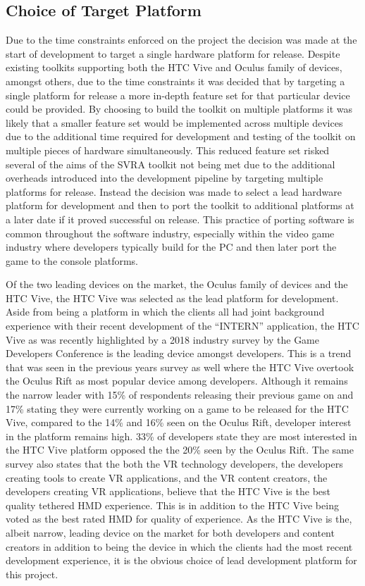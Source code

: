 \documentclass{l4proj}
\begin{document}
\subsection{Choice of Target Platform}
\label{sec:decisionhardware}
Due to the time constraints enforced on the project the decision was made at the start of development to target a single hardware platform for release. Despite existing toolkits supporting both the HTC Vive and Oculus family of devices, amongst others, due to the time constraints it was decided that by targeting a single platform for release a more in-depth feature set for that particular device could be provided. By choosing to build the toolkit on multiple platforms it was likely that a smaller feature set would be implemented across multiple devices due to the additional time required for development and testing of the toolkit on multiple pieces of hardware simultaneously. This reduced feature set risked several of the aims of the SVRA toolkit not being met due to the additional overheads introduced into the development pipeline by targeting multiple platforms for release. Instead the decision was made to select a lead hardware platform for development and then to port the toolkit to additional platforms at a later date if it proved successful on release. This practice of porting software is common throughout the software industry, especially within the video game industry where developers typically build for the PC and then later port the game to the console platforms.

Of the two leading devices on the market, the Oculus family of devices and the HTC Vive, the HTC Vive was selected as the lead platform for development. Aside from being a platform in which the clients all had joint background experience with their recent development of the ``INTERN'' application, the HTC Vive as was recently highlighted by a 2018 industry survey by the Game Developers Conference \cite{gdcsurvey} is the leading device amongst developers. This is a trend that was seen in the previous years survey as well where the HTC Vive overtook the Oculus Rift as most popular device among developers. Although it remains the narrow leader with 15\% of respondents releasing their previous game on and 17\% stating they were currently working on a game to be released for the HTC Vive, compared to the 14\% and 16\% seen on the Oculus Rift, developer interest in the platform remains high. 33\% of developers state they are most interested in the HTC Vive platform opposed the the 20\% seen by the Oculus Rift. The same survey also states that the both the VR technology developers, the developers creating tools to create VR applications, and the VR content creators, the developers creating VR applications, believe that the HTC Vive is the best quality tethered HMD experience. This is in addition to the HTC Vive being voted as the best rated HMD for quality of experience. As the HTC Vive is the, albeit narrow, leading device on the market for both developers and content creators in addition to being the device in which the clients had the most recent development experience, it is the obvious choice of lead development platform for this project.
\end{document}

